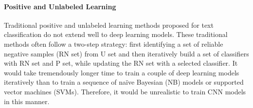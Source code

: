


\paragraph{Positive and Unlabeled Learning}

Traditional positive and unlabeled learning methods proposed for text classification\cite{liu2003building} do not extend well to deep learning models.
These traditional methods often follow a two-step strategy: first identifying a set of reliable negative samples (RN set) from U set and then iteratively build a set of classifiers with RN set and P set, while updating the RN set with a selected classifier.
It would take tremendously longer time to train a couple of deep learning models iteratively than to train a sequence of na\"ive Bayesian (NB) models or supported vector machines (SVMs).
Therefore, it would be unrealistic to train CNN models in this manner.

